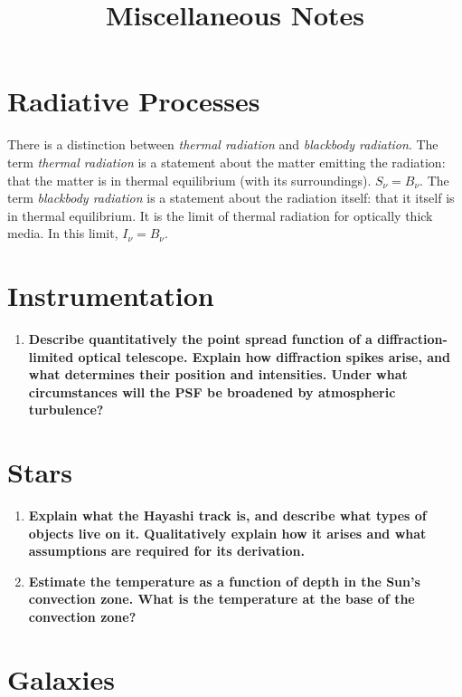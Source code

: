 \documentclass[12pt, letterpaper, preprint]{aastex}
\begin{document}
\title{Miscellaneous Notes}

\section*{Radiative Processes}

There is a distinction between \emph{thermal radiation}
and \emph{blackbody radiation}.
The term \emph{thermal radiation} is a statement about the
matter emitting the radiation: that the matter is in thermal
equilibrium (with its surroundings).
$S_\nu = B_\nu$.
The term \emph{blackbody radiation} is a statement about the
radiation itself: that it itself is in thermal equilibrium.
It is the limit of thermal radiation for optically thick media.
In this limit, $I_\nu = B_\nu$.

\section*{Instrumentation}

\begin{enumerate}
  \item \textbf{Describe quantitatively the point spread function 
      of a diffraction-limited optical telescope. 
      Explain how diffraction spikes arise, 
      and what determines their position and intensities. 
      Under what circumstances will the PSF be broadened by atmospheric
      turbulence?}
\end{enumerate}

\section*{Stars}
\begin{enumerate}
  \item \textbf{Explain what the Hayashi track is, 
      and describe what types of objects live on it.
      Qualitatively explain how it arises and what 
      assumptions are required for its derivation.}
  \item \textbf{Estimate the temperature as a function 
      of depth in the Sun’s convection zone.
      What is the temperature at the base of the convection zone?}
\end{enumerate}

\section*{Galaxies}
\end{document}
